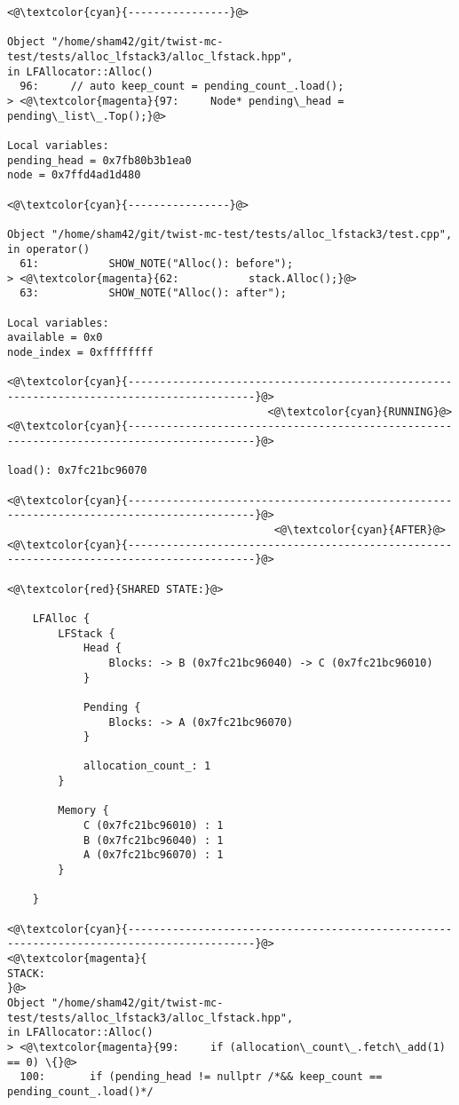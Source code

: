 \begin{adjustwidth}{-3.3cm}{-1cm}
\begin{allintypewriter}
\begin{multicols*}{2}
\begin{lstlisting}[numbers=none]
<@\textcolor{cyan}{----------------}@>

Object "/home/sham42/git/twist-mc-test/tests/alloc_lfstack3/alloc_lfstack.hpp",
in LFAllocator::Alloc()
  96:     // auto keep_count = pending_count_.load();
> <@\textcolor{magenta}{97:     Node* pending\_head = pending\_list\_.Top();}@>

Local variables: 
pending_head = 0x7fb80b3b1ea0
node = 0x7ffd4ad1d480

<@\textcolor{cyan}{----------------}@>

Object "/home/sham42/git/twist-mc-test/tests/alloc_lfstack3/test.cpp",
in operator()
  61:           SHOW_NOTE("Alloc(): before");
> <@\textcolor{magenta}{62:           stack.Alloc();}@>
  63:           SHOW_NOTE("Alloc(): after");

Local variables: 
available = 0x0
node_index = 0xffffffff

<@\textcolor{cyan}{------------------------------------------------------------------------------------------}@>
                                         <@\textcolor{cyan}{RUNNING}@>
<@\textcolor{cyan}{------------------------------------------------------------------------------------------}@>

load(): 0x7fc21bc96070

<@\textcolor{cyan}{------------------------------------------------------------------------------------------}@>
                                          <@\textcolor{cyan}{AFTER}@>
<@\textcolor{cyan}{------------------------------------------------------------------------------------------}@>

<@\textcolor{red}{SHARED STATE:}@>

    LFAlloc {
	    LFStack {
		    Head {
			    Blocks: -> B (0x7fc21bc96040) -> C (0x7fc21bc96010) 
		    }

		    Pending {
			    Blocks: -> A (0x7fc21bc96070) 
		    }

		    allocation_count_: 1
	    }

	    Memory {
		    C (0x7fc21bc96010) : 1
		    B (0x7fc21bc96040) : 1
		    A (0x7fc21bc96070) : 1
	    }

    }

<@\textcolor{cyan}{------------------------------------------------------------------------------------------}@>
<@\textcolor{magenta}{
STACK:
}@>
Object "/home/sham42/git/twist-mc-test/tests/alloc_lfstack3/alloc_lfstack.hpp",
in LFAllocator::Alloc()
> <@\textcolor{magenta}{99:     if (allocation\_count\_.fetch\_add(1) == 0) \{}@>
  100:       if (pending_head != nullptr /*&& keep_count == pending_count_.load()*/


\end{lstlisting}
\end{multicols*}
\end{allintypewriter}
\end{adjustwidth}
